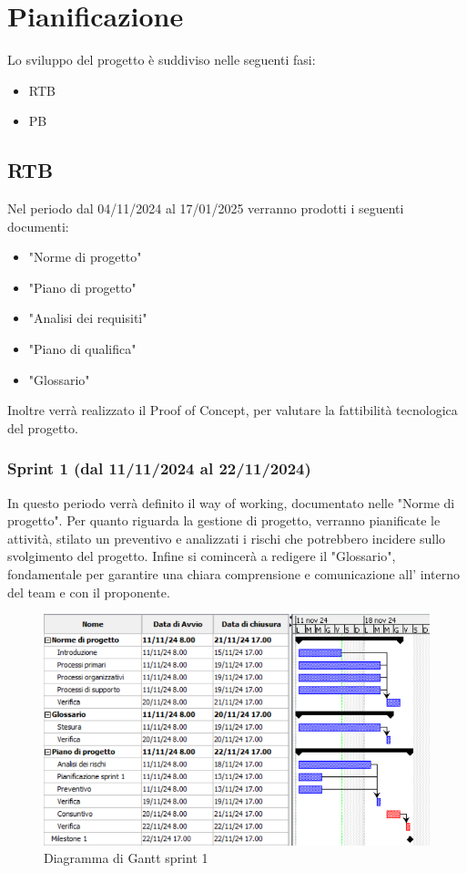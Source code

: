 \section{Pianificazione}
Lo sviluppo del progetto è suddiviso nelle seguenti fasi:
    \begin{itemize}
        \item  RTB
        \item PB
    \end{itemize}
    \subsection{RTB}
    Nel periodo dal 04/11/2024 al 17/01/2025 verranno prodotti i seguenti documenti:
        \begin{itemize}
            \item "Norme di progetto"
            \item "Piano di progetto"
            \item "Analisi dei requisiti"
            \item "Piano di qualifica"
            \item "Glossario"
        \end{itemize}
    Inoltre verrà realizzato il Proof of Concept, per valutare la fattibilità tecnologica del progetto.
        \subsubsection{Sprint 1 (dal 11/11/2024 al 22/11/2024)}
        In questo periodo verrà definito il way of working, documentato nelle
        "Norme di progetto". Per quanto riguarda la gestione di progetto, verranno 
        pianificate le attività, stilato un preventivo e analizzati i rischi che potrebbero
        incidere sullo svolgimento del progetto. Infine si comincerà a redigere il 
        "Glossario", fondamentale per garantire una chiara comprensione e comunicazione all'
        interno del team e con il proponente.
        \\
        \begin{figure}[h!]
            \centering
            \includegraphics[scale = 0.85]{template/images/gantt1.png}
            \caption{Diagramma di Gantt sprint 1}
            \label{fig:3.1} %
        \end{figure}
        